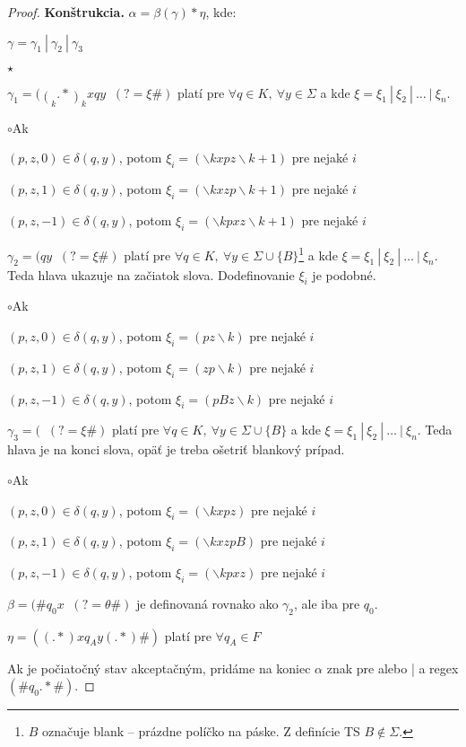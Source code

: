 \begin{proof}
\textbf{Konštrukcia.} $\alpha = \beta(\gamma)*\eta$, kde:
\begin{itemize}
\item $\gamma = \gamma_1~|~\gamma_2~|~\gamma_3$
\begin{list}{$\star$}{}
\item $ \displaystyle \gamma_1 = (\mathop(_k.*\mathop)_k x q y \mathop(_{k+1} .* \mathop)_{k+1} \#)(?= \xi \#)$ platí pre $\forall q \in K,~\forall y \in \Sigma$ a kde $ \xi = \xi_1 ~|~ \xi_2 ~|~ \dots ~|~ \xi_n $.
\begin{list}{$\circ$}{Ak}
\item $ (p,z,0) \in \delta(q,y)$, potom $\xi_i = (\backslash kx p z \backslash k+1)$ pre nejaké $i$
\item $ (p,z,1) \in \delta(q,y)$, potom $\xi_i = (\backslash kx z p \backslash k+1)$ pre nejaké $i$
\item $ (p,z,-1) \in \delta(q,y)$, potom $\xi_i = (\backslash kp x z \backslash k+1)$ pre nejaké $i$
\end{list}
\item $ \displaystyle \gamma_2 = (q y \mathop(_{k} .* \mathop)_{k+1} \#)(?= \xi \#)$ platí pre $\forall q \in K,~\forall y \in \Sigma \cup \lbrace B \rbrace$\footnote{$B$ označuje blank -- prázdne políčko na páske. Z definície TS $B \notin \Sigma$.} a kde $ \xi = \xi_1 ~|~ \xi_2 ~|~ \dots ~|~ \xi_n $. Teda hlava ukazuje na začiatok slova. Dodefinovanie $\xi_i$ je podobné.
\begin{list}{$\circ$}{Ak}
\item $ (p,z,0) \in \delta(q,y)$, potom $\xi_i = (p z \backslash k)$ pre nejaké $i$
\item $ (p,z,1) \in \delta(q,y)$, potom $\xi_i = (z p \backslash k)$ pre nejaké $i$
\item $ (p,z,-1) \in \delta(q,y)$, potom $\xi_i = (p B z \backslash k)$ pre nejaké $i$ 
\end{list}
\item $ \displaystyle \gamma_3 = (\mathop(_k.*\mathop)_k x q y \#)(?= \xi \#)$ platí pre $\forall q \in K,~\forall y \in \Sigma \cup \lbrace B \rbrace$ a kde $ \xi = \xi_1 ~|~ \xi_2 ~|~ \dots ~|~ \xi_n $. Teda hlava je na konci slova, opäť je treba ošetriť blankový prípad.
\begin{list}{$\circ$}{Ak}
\item $ (p,z,0) \in \delta(q,y)$, potom $\xi_i = (\backslash kx p z)$ pre nejaké $i$
\item $ (p,z,1) \in \delta(q,y)$, potom $\xi_i = (\backslash kx z p B)$ pre nejaké $i$
\item $ (p,z,-1) \in \delta(q,y)$, potom $\xi_i = (\backslash kp x z)$ pre nejaké $i$
\end{list}
\end{list}
\item $\displaystyle \beta = (\#q_0x\mathop(_k.*\mathop)_k\#)(?=\theta\#) $ je definovaná rovnako ako $\gamma_2$, ale iba pre $q_0$.
\item $\eta = ((.*) x q_A y (.*)\#)$ platí pre $\forall q_A \in F$
\end{itemize}
Ak je počiatočný stav akceptačným, pridáme na koniec $\alpha$ znak pre alebo | a regex $(\#q_0.*\#)$.
\end{proof}

